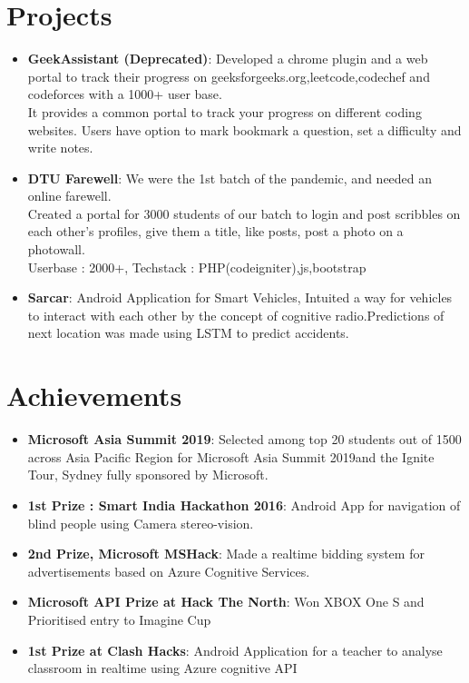 \documentclass[letterpaper,11pt]{article}
\newcommand{\resumeItem}[2]{
  \item\small{
    \textbf{#1}{: #2 \vspace{-2pt}}
  }
}
\newcommand{\resumeSubItem}[2]{\resumeItem{#1}{#2}\vspace{-6pt}}
\newcommand{\resumeSubHeadingListStart}{\begin{itemize}[leftmargin=*]}
\newcommand{\resumeSubHeadingListEnd}{\end{itemize}}
\begin{document}
\section{Projects}
  \resumeSubHeadingListStart
    \resumeSubItem{GeekAssistant (Deprecated)}
      {Developed a chrome plugin and a web portal to track their progress on geeksforgeeks.org,leetcode,codechef and codeforces with a 1000+ user base.}
      \\[0.5em]\textbullet
      {It provides a common portal to track your progress on different coding websites. Users have option to mark bookmark a question, set a difficulty and write notes.}
    \resumeSubItem{DTU Farewell}
      {We were the 1st batch of the pandemic, and needed an online farewell.}
      \\[0.5em]\textbullet
      { Created a portal for 3000 students of our batch to login and post scribbles on each other's profiles, give them a title, like posts, post a photo on a photowall.}
      \\[0em]\textbullet
      { Userbase : 2000+, Techstack : PHP(codeigniter),js,bootstrap}
    \resumeSubItem{Sarcar}
      {Android Application for Smart Vehicles, Intuited a way for vehicles to interact with each other by the concept of cognitive radio.Predictions of next location was made using LSTM to predict accidents.}
      \\[0.5em]
  \resumeSubHeadingListEnd

\section{Achievements}
    \resumeSubHeadingListStart
    \resumeSubItem
    {Microsoft Asia Summit 2019}
    {Selected among top 20 students out of 1500 across Asia Pacific Region for Microsoft Asia Summit 2019and the Ignite Tour, Sydney fully sponsored by Microsoft.}
    \resumeSubItem
    {1st Prize : Smart India Hackathon 2016}
    {Android App for navigation of blind people using Camera stereo-vision.}
    \resumeSubItem
    {2nd Prize, Microsoft MSHack}
    { Made a realtime bidding system for advertisements based on Azure Cognitive Services.}
    \resumeSubItem
    {Microsoft API Prize at Hack The North}
    {Won XBOX One S and Prioritised entry to Imagine Cup}
    \resumeSubItem
    {1st Prize at Clash Hacks}
    {Android Application for a teacher to analyse classroom in realtime using Azure cognitive API}
    \resumeSubHeadingListEnd
\end{document}
